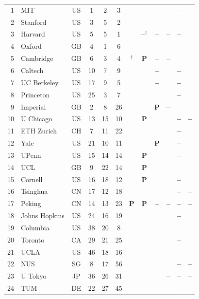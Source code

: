 \documentclass[pdflatex,sn-basic,Numbered,iicol]{sn-jnl}
\newcommand{\si}{\ding{51}}
\newcommand{\no}{\textcolor{gris}{\textbf{--}}}
\newcommand{\pc}{\textbf{P}}
\theoremstyle{thmstyleone}
\theoremstyle{thmstyletwo}
\theoremstyle{thmstylethree}
\begin{document}
\begin{appendices}
\begin{longtable}{@{}r l c c c c c c c c c c@{}}
	1 & MIT & US & 1 & 2 & 3 & \si & \si & \si & \si & \no & \si \\
	2 & Stanford & US & 3 & 5 & 2 & \si & \si & \si & \si & \si & \si \\
	3 & Harvard & US & 5 & 5 & 1 & \si & \no$^\dagger$ & \no & \no & \no & \si \\
	4 & Oxford & GB & 4 & 1 & 6 & \si & \si & \si & \si & \si & \si \\
	5 & Cambridge & GB & 6 & 3 & 4 & \si$^\dagger$ & \pc & \no & \no & \si & \si \\
	6 & Caltech & US & 10 & 7 & 9 & \si & \si & \no & \si & \no & \si \\
	7 & UC Berkeley & US & 17 & 9 & 5 & \si & \si & \no & \si & \no & \si \\
	8 & Princeton & US & 25 & 3 & 7 & \si & \si & \si & \si & \no & \si \\
	9 & Imperial & GB & 2 & 8 & 26 & \si & \si & \pc & \no & \si & \si \\
	10 & U Chicago & US & 13 & 15 & 10 & \si & \pc & \si & \si & \no & \no \\
	11 & ETH Zurich & CH & 7 & 11 & 22 & \si & \si & \si & \si & \no & \si \\
	12 & Yale & US & 21 & 10 & 11 & \si & \si & \pc & \si & \no & \si \\
	13 & UPenn & US & 15 & 14 & 14 & \si & \pc & \si & \si & \no & \si \\
	14 & UCL & GB & 9 & 22 & 14 & \si & \pc & \si & \si & \si & \si \\
	15 & Cornell & US & 16 & 18 & 12 & \si & \pc & \si & \si & \no & \si \\
	16 & Tsinghua & CN & 17 & 12 & 18 & \si & \si & \si & \si & \no & \no \\
	17 & Peking & CN & 14 & 13 & 23 & \pc & \pc & \no & \no & \no & \no \\
	18 & Johns Hopkins & US & 24 & 16 & 19 & \si & \si & \si & \si & \no & \si \\
	19 & Columbia & US & 38 & 20 & 8 & \si & \si & \si & \si & \si & \si \\
	20 & Toronto & CA & 29 & 21 & 25 & \si & \si & \si & \si & \no & \si \\
	21 & UCLA & US & 46 & 18 & 16 & \si & \si & \si & \si & \no & \si \\
	22 & NUS & SG & 8 & 17 & 56 & \si & \si & \si & \si & \no & \no \\
	23 & U Tokyo & JP & 36 & 26 & 31 & \si & \si & \si & \no & \no & \no \\
	24 & TUM & DE & 22 & 27 & 45 & \si & \si & \si & \si & \no & \no \\

\end{longtable}
\end{appendices}
\end{document}
